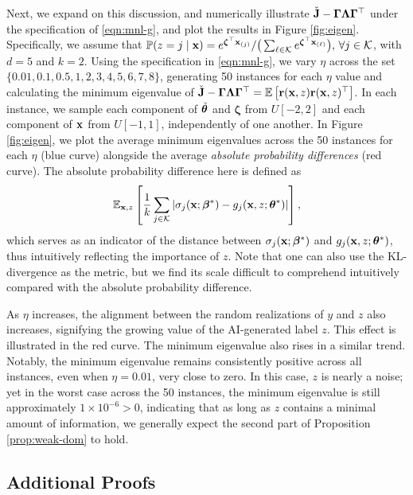 Next, we expand on this discussion, and numerically illustrate $ \check{\mathbf{J}} -  \bm{\Gamma}\bm{\Lambda}\bm{\Gamma}^{\top} $ under the specification of \eqref{eqn:mnl-g}, 
and plot the results in Figure \ref{fig:eigen}. Specifically, we assume that 
$
\mathbb{P}(z = j \mid \mathbf{x}) = {e^{\bm{\zeta}^{\top}\mathbf{x}_{(j)}}}/\big(\sum_{\ell \in \mathcal{K}} e^{\bm{\zeta}^{\top}\mathbf{x}_{(\ell)}}\big),\,\forall j\in \mathcal{K}
$,
with $ d = 5 $ and $ k = 2 $.
Using the specification in \eqref{eqn:mnl-g}, we vary $ \eta $ across the set $ \{0.01, 0.1, 0.5, 1, 2, 3, 4, 5, 6, 7, 8\} $, generating 50 instances for each $ \eta $ value and calculating the minimum eigenvalue of $ \check{\mathbf{J}} -  \bm{\Gamma}\bm{\Lambda}\bm{\Gamma}^{\top} = \mathbb{E}\left[\mathbf{r}(\mathbf{x}, z)\mathbf{r}(\mathbf{x}, z)^{\top}\right] $. In each instance, we sample each component of $ \check{\bm{\theta}} $ and $ \bm{\zeta} $ from $ U[-2, 2] $ and each component of $ \mathbf{x} $ from $ U[-1, 1] $, independently of one another.
In Figure \ref{fig:eigen}, we plot the average minimum eigenvalues across the 50 instances for each $ \eta $ (blue curve) alongside the average \textit{absolute probability differences} (red curve). The absolute probability difference here is defined as
\[
\mathbb{E}_{\mathbf{x}, z}\left[\frac{1}{k} \sum_{j \in \mathcal{K}} \left| \sigma_{j}(\mathbf{x}; \bm{\beta}^*) - g_{j}(\mathbf{x}, z; \bm{\theta}^*) \right|\right],
\]
which serves as an indicator of the distance between $ \sigma_{j}(\mathbf{x}; \bm{\beta}^*) $ and $ g_{j}(\mathbf{x}, z; \bm{\theta}^*) $, thus intuitively reflecting the importance of $ z $.
Note that one can also use the KL-divergence as the metric, but we find its scale difficult to comprehend intuitively compared with the absolute probability difference. 

As $ \eta $ increases, the alignment between the random realizations of $ y $ and $ z $ also increases, signifying the growing value of the AI-generated label $ z $. This effect is illustrated in the red curve. 
The minimum eigenvalue also rises in a similar trend. Notably, the minimum eigenvalue remains consistently positive across all instances, even when $ \eta = 0.01 $, very close to zero. In this case, $z$ is nearly a noise; yet in the worst case across the 50 instances, the minimum eigenvalue is still approximately $ 1 \times 10^{-6} > 0 $, indicating that as long as $ z $ contains a minimal amount of information, we generally expect the second part of Proposition \ref{prop:weak-dom} to hold.

\subsection{Additional Proofs}

